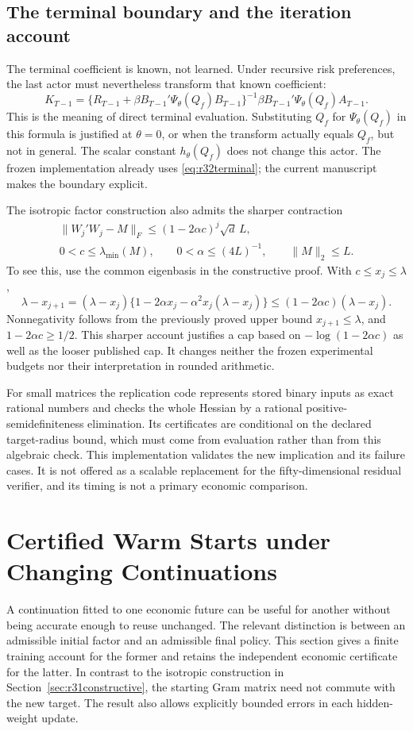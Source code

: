 \documentclass[ecta,nameyear,draft]{econsocart}
\theoremstyle{definition}
\theoremstyle{remark}
\begin{document}
\subsection{The terminal boundary and the iteration account}
The terminal coefficient is known, not learned. Under recursive risk
preferences, the last actor must nevertheless transform that known coefficient:
\begin{equation}\label{eq:r32terminal}
 K_{T-1}=\{R_{T-1}+\beta B_{T-1}'\Psi_\theta(Q_f)B_{T-1}\}^{-1}
              \beta B_{T-1}'\Psi_\theta(Q_f)A_{T-1}.
\end{equation}
This is the meaning of direct terminal evaluation. Substituting $Q_f$ for
$\Psi_\theta(Q_f)$ in this formula is justified at $\theta=0$, or when the
transform actually equals $Q_f$, but not in general. The scalar constant
$h_\theta(Q_f)$ does not change this actor. The frozen implementation already
uses \eqref{eq:r32terminal}; the current manuscript makes the boundary explicit.

The isotropic factor construction also admits the sharper contraction
\begin{gather*}
 \|W_j'W_j-M\|_F\leq(1-2\alpha c)^j\sqrt d\,L,\\
 0<c\leq\lambda_{\min}(M),\qquad
 0<\alpha\leq(4L)^{-1},\qquad\|M\|_2\leq L.
\end{gather*}
To see this, use the common eigenbasis in the constructive proof. With
$c\leq x_j\leq\lambda$,
\[
 \lambda-x_{j+1}=(\lambda-x_j)
   \{1-2\alpha x_j-\alpha^2x_j(\lambda-x_j)\}
 \leq(1-2\alpha c)(\lambda-x_j).
\]
Nonnegativity follows from the previously proved upper bound
$x_{j+1}\leq\lambda$, and $1-2\alpha c\geq1/2$. This sharper account
justifies a cap based on $-\log(1-2\alpha c)$ as well as the looser published
cap. It changes neither the frozen experimental budgets nor their interpretation
in rounded arithmetic.

For small matrices the replication code represents stored binary inputs as
exact rational numbers and checks the whole Hessian by a rational
positive-semidefiniteness elimination. Its certificates are conditional on the
declared target-radius bound, which must come from evaluation rather than from
this algebraic check. This implementation validates the new implication and
its failure cases. It is not offered as a scalable replacement for the
fifty-dimensional residual verifier, and its timing is not a primary economic
comparison.

\section{Certified Warm Starts under Changing Continuations}\label{sec:r33warm}
A continuation fitted to one economic future can be useful for another without
being accurate enough to reuse unchanged. The relevant distinction is between
an admissible initial factor and an admissible final policy. This section gives
a finite training account for the former and retains the independent economic
certificate for the latter. In contrast to the isotropic construction in
Section~\ref{sec:r31constructive}, the starting Gram matrix need not commute
with the new target. The result also allows explicitly bounded errors in each
hidden-weight update.
\end{document}
